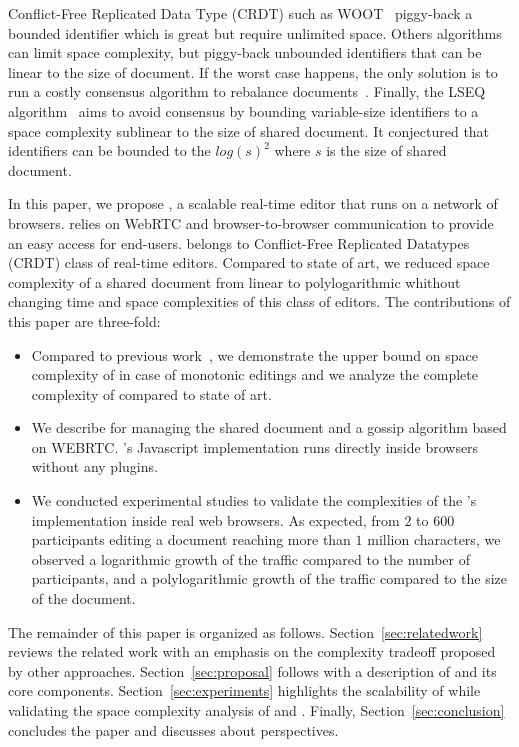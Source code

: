 Conflict-Free Replicated Data Type
(CRDT)\cite{shapiro2011comprehensive} such as
WOOT~\cite{oster2006data} piggy-back a bounded identifier which is
great but require unlimited space. Others algorithms can limit space
complexity, but piggy-back unbounded identifiers that can be linear to
the size of
document\cite{weiss2010logootundo,preguica2009commutative}. If the
worst case happens, the only solution is to run a costly consensus
algorithm to rebalance documents~\cite{zawirskiasynchronous}. Finally,
the LSEQ algorithm~\cite{nedelec2013concurrency} aims to avoid consensus
by bounding variable-size identifiers to a space complexity sublinear
to the size of shared document. It conjectured that identifiers can be
bounded to the $log(s)^2$ where $s$ is the size of shared document.

In this paper, we propose \CRATE, a scalable real-time editor that
runs on a network of browsers. \CRATE relies on WebRTC and
browser-to-browser communication to provide an easy access for
end-users. \CRATE belongs to Conflict-Free Replicated Datatypes (CRDT)
class of real-time editors. Compared to state of art, we reduced space
complexity of a shared document from linear to polylogarithmic
whithout changing time and space complexities of this class of editors.
 The contributions of this paper are three-fold:
\begin{itemize}
\item Compared to previous work~\cite{nedelec2013lseq}, we demonstrate
  the upper bound on space complexity of \LSEQ in case of monotonic
  editings and we analyze the complete complexity of \CRATE compared
  to state of art.
\item We describe \LSEQ for managing the shared document
  and \SPRAY a gossip algorithm based on WEBRTC. \CRATE's Javascript
  implementation runs directly inside browsers without any plugins.
\item We conducted experimental studies to validate the complexities of the
  \CRATE's implementation inside real web browsers. As expected, from $2$ to $600$
  participants editing a document reaching more than $1$ million characters, we
  observed a logarithmic growth of the traffic compared to the number of
  participants, and a polylogarithmic growth of the traffic compared to the size
  of the document.
\end{itemize}

The remainder of this paper is organized as
follows. Section~\ref{sec:relatedwork} reviews the related work with an emphasis
on the complexity tradeoff proposed by other
approaches. Section~\ref{sec:proposal} follows with a description of \CRATE and
its core components. Section~\ref{sec:experiments} highlights the scalability of
\CRATE while validating the space complexity analysis of \LSEQ and
\SPRAY. Finally, Section~\ref{sec:conclusion} concludes the paper and discusses
about perspectives.

